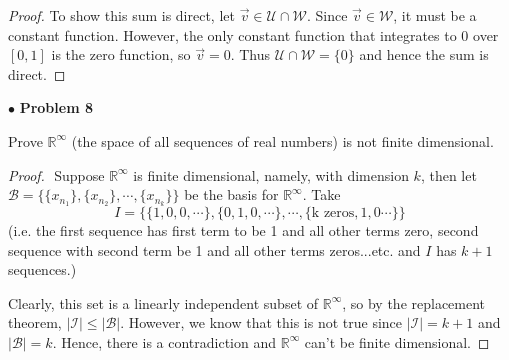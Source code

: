 \documentclass{article}
\begin{document}
\begin{proof}
To show this sum is direct, let $\vec{v} \in \mathcal{U} \cap \mathcal{W}$. Since $\vec{v} \in \mathcal{W}$, it must be a constant function. However, the only constant function that integrates to 0 over $[0,1]$ is the zero function, so $\vec{v} = 0$. Thus $\mathcal{U} \cap \mathcal{W} = \{ 0 \}$ and hence the sum is direct.
\end{proof}

\newpage
$ \bullet$ \textbf{Problem 8}
\medskip

\begin{itshape}
Prove $\mathbb{R}^ \infty$ (the space of all sequences of real numbers) is not finite dimensional.
\end{itshape}
\medskip

\begin{proof}
$ $\newline
Suppose $\mathbb{R}^\infty$ is finite dimensional, namely, with dimension $k$, then let $\mathcal{B} = \{ \{x_{n_1} \}, \{x_{n_2} \}, \cdots , \{x_{n_k} \} \}$ be the basis for $\mathbb{R}^\infty$. Take $$I= \{ \{1, 0, 0, \cdots \}, \{0, 1,0, \cdots \}, \cdots , \{ \text{k zeros}, 1, 0 \cdots \}  \}$$ (i.e. the first sequence has first term to be 1 and all other terms zero, second sequence with second term be 1 and all other terms zeros...etc. and $I$ has $k+1$ sequences.)

Clearly, this set is a linearly independent subset of $\mathbb{R}^\infty$, so by the replacement theorem, $| \mathcal{I} | \le | \mathcal{B} |$. However, we know that this is not true since $| \mathcal{I} | = k+1$ and $ | \mathcal{B} | = k$. Hence, there is a contradiction and $\mathbb{R}^\infty$ can't be finite dimensional.
\end{proof}
\end{document}
